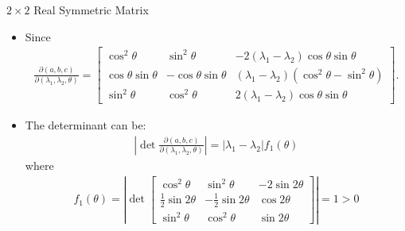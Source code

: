 \documentclass[UTF8,AutoFakeBold,AutoFakeSlant]{beamer}
\begin{document}
\begin{frame}{$2\times 2$ Real Symmetric Matrix}
    \begin{itemize}
        \scriptsize
        \item Since
              \begin{align*}
                  \frac{\partial(a,b,c)}{\partial(\lambda_1,\lambda_2,\theta)}=\begin{bmatrix}\cos^2\theta&\sin^2\theta&-2(\lambda_1-\lambda_2)\cos\theta\sin\theta\\\cos\theta\sin\theta&-\cos\theta\sin\theta&(\lambda_1-\lambda_2)(\cos^2\theta-\sin^2\theta)\\\sin^2\theta&\cos^2\theta&2(\lambda_1-\lambda_2)\cos\theta\sin\theta\end{bmatrix}.
              \end{align*}
        \item The determinant can be:
              \begin{align*}
                  \left|\det\frac{\partial(a,b,c)}{\partial(\lambda_1,\lambda_2,\theta)}\right|=|\lambda_1-\lambda_2|f_1(\theta)
              \end{align*}
              where \begin{align*}
                  \left.f_1(\theta)=\left|\det\begin{bmatrix}\cos^2\theta&\sin^2\theta&-2\sin2\theta\\\frac12\sin2\theta&-\frac12\sin2\theta&\cos2\theta\\\sin^2\theta&\cos^2\theta&\sin2\theta\end{bmatrix}\right.\right|=1>0
              \end{align*}
    \end{itemize}
\end{frame}
\end{document}
